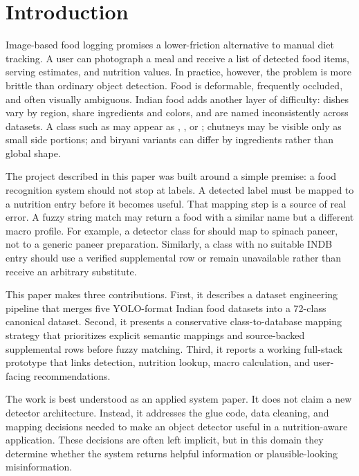 \documentclass[conference]{IEEEtran}
\newcommand{\code}[1]{\texttt{\detokenize{#1}}}
\begin{document}
\section{Introduction}

Image-based food logging promises a lower-friction alternative to manual diet tracking. A user can photograph a meal and receive a list of detected food items, serving estimates, and nutrition values. In practice, however, the problem is more brittle than ordinary object detection. Food is deformable, frequently occluded, and often visually ambiguous. Indian food adds another layer of difficulty: dishes vary by region, share ingredients and colors, and are named inconsistently across datasets. A class such as \code{rice} may appear as \code{WhiteRice}, \code{satham}, or \code{boiled rice}; chutneys may be visible only as small side portions; and biryani variants can differ by ingredients rather than global shape.

The project described in this paper was built around a simple premise: a food recognition system should not stop at labels. A detected label must be mapped to a nutrition entry before it becomes useful. That mapping step is a source of real error. A fuzzy string match may return a food with a similar name but a different macro profile. For example, a detector class for \code{palak_paneer} should map to spinach paneer, not to a generic paneer preparation. Similarly, a class with no suitable INDB entry should use a verified supplemental row or remain unavailable rather than receive an arbitrary substitute.

This paper makes three contributions. First, it describes a dataset engineering pipeline that merges five YOLO-format Indian food datasets into a 72-class canonical dataset. Second, it presents a conservative class-to-database mapping strategy that prioritizes explicit semantic mappings and source-backed supplemental rows before fuzzy matching. Third, it reports a working full-stack prototype that links detection, nutrition lookup, macro calculation, and user-facing recommendations.

The work is best understood as an applied system paper. It does not claim a new detector architecture. Instead, it addresses the glue code, data cleaning, and mapping decisions needed to make an object detector useful in a nutrition-aware application. These decisions are often left implicit, but in this domain they determine whether the system returns helpful information or plausible-looking misinformation.
\end{document}
